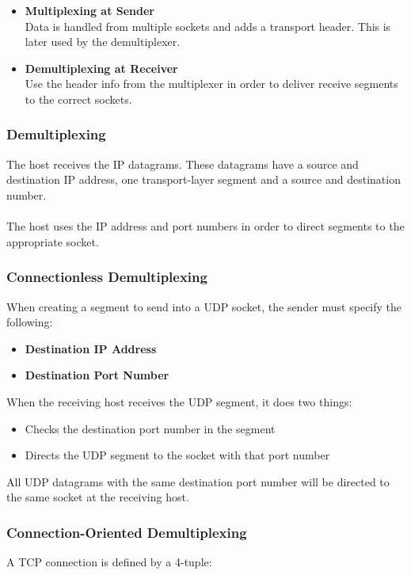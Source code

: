 \documentclass{article}
\begin{document}
\begin{itemize}
	\item \textbf{Multiplexing at Sender}
	\vspace{.2cm} \\
	Data is handled from multiple sockets and adds a transport header. This is later used by the demultiplexer.
	
	\item \textbf{Demultiplexing at Receiver}
	\vspace{.2cm} \\
	Use the header info from the multiplexer in order to deliver receive segments to the correct sockets.
\end{itemize}

\subsubsection{Demultiplexing}
The host receives the IP datagrams. These datagrams have a source and destination IP address, one transport-layer segment and a source and destination number. \\ \\
The host uses the IP address and port numbers in order to direct segments to the appropriate socket.

\subsubsection{Connectionless Demultiplexing}
When creating a segment to send into a UDP socket, the sender must specify the following:

\begin{itemize}
	\item \textbf{Destination IP Address}
	\item \textbf{Destination Port Number}
\end{itemize}

When the receiving host receives the UDP segment, it does two things:

\begin{itemize}
	\item Checks the destination port number in the segment
	\item Directs the UDP segment to the socket with that port number
\end{itemize}
All UDP datagrams with the same destination port number will be directed to the same socket at the receiving host.

\subsubsection{Connection-Oriented Demultiplexing}
A TCP connection is defined by a 4-tuple:
\end{document}
